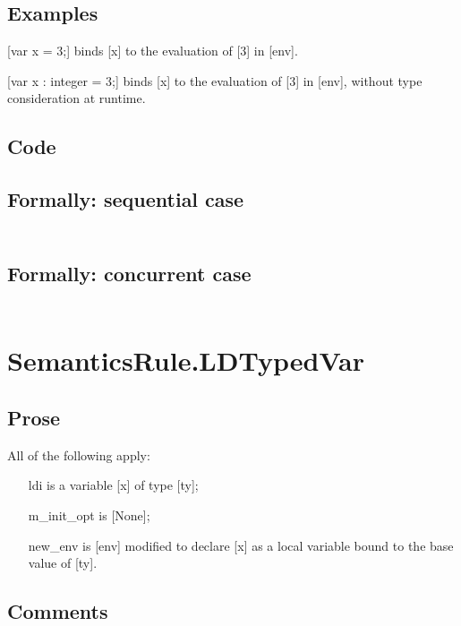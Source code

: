 \documentclass{book}
\begin{document}
    \subsection{Examples}
    [var x = 3;] binds [x] to the evaluation of [3] in [env].

    [var x : integer = 3;] binds [x] to the evaluation of [3] in [env], without
    type consideration at runtime.

  \subsection{Code}

  \subsection{Formally: sequential case}
  \begin{align}
  \end{align} 

  \subsection{Formally: concurrent case}
  \begin{align}
  \end{align} 

\section{SemanticsRule.LDTypedVar \label{sec:SemanticsRule.LDTypedVar}}

    \subsection{Prose}
    All of the following apply:
    \begin{itemize}
    \item [ldi] is a variable [x] of type [ty];
    \item [m\_init\_opt] is [None];
    \item [new\_env] is [env] modified to declare [x] as a local variable bound to
      the base value of [ty].
    \end{itemize}

    \subsection{Comments}
\end{document}

